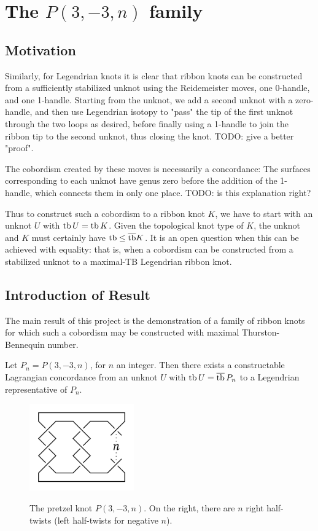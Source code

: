 \chapter{The \texorpdfstring{$P(3, -3, n)$}{P(3, -3, n)} family}
\section{Motivation}
Similarly, for Legendrian knots it is clear that ribbon knots can be constructed from a sufficiently stabilized unknot using the Reidemeister moves, one 0-handle, and one 1-handle. 
Starting from the unknot, we add a second unknot with a zero-handle, and then use Legendrian isotopy to "pass" the tip of the first unknot through the two loops as desired, before finally using a 1-handle to join the ribbon tip to the second unknot, thus closing the knot. 
TODO: give a better "proof".

The cobordism created by these moves is necessarily a concordance: The surfaces corresponding to each unknot have genus zero before the addition of the 1-handle, which connects them in only one place.
TODO: is this explanation right?

Thus to construct such a cobordism to a ribbon knot $K$, we have to start with an unknot $U$ with $\operatorname{tb} U = \operatorname{tb} K$. Given the topological knot type of $K$, the unknot and $K$ must certainly have $\operatorname{tb} \leq \overline{\operatorname{tb}} K$.
It is an open question when this can be achieved with equality: that is, when a cobordism can be constructed from a stabilized unknot to a maximal-TB Legendrian ribbon knot. 

\section{Introduction of Result}
The main result of this project is the demonstration of a family of ribbon knots for which such a cobordism may be constructed with maximal Thurston-Bennequin number.

\begin{theorem}\label{thm:mine}
    Let $P_n = P(3, -3, n)$, for $n$ an integer. Then there exists a constructable Lagrangian concordance from an unknot $U$ with $\operatorname{tb} U = \overline{\operatorname{tb}}\, P_n$ to a Legendrian representative of $P_n$.
\end{theorem}

\begin{figure}[ht!]
    \centering
    \includegraphics[width=0.4\textwidth]{images/pretzel-knot.pdf}
    \label{fig:pretzel-knot}
    \caption{The pretzel knot $P(3, -3, n)$. On the right, there are $n$ right half-twists (left half-twists for negative $n$).}
\end{figure}

